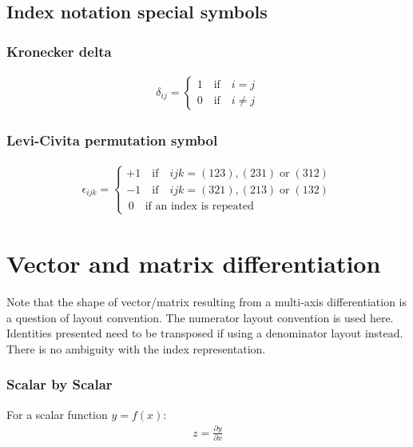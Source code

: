 \subsection{Index notation special symbols}

\subsubsection{ Kronecker delta }
\begin{align}
\delta_{ij} = \left\lbrace \begin{array}{c}
1 \quad\text{if}\quad i=j\\
0 \quad\text{if}\quad i\neq j
\end{array}
\right.
\end{align}


\subsubsection{ Levi-Civita permutation symbol }
\begin{align}
\epsilon_{ijk} = \left\lbrace \begin{array}{l}
+1  \quad\text{if}\quad ijk=(123),(231) \;\text{or}\; (312)\\
-1   \quad\text{if}\quad ijk=(321),(213) \;\text{or}\; (132)\\
\,0  \quad\text{if an index is repeated}
\end{array}
\right.
\end{align}



\section{Vector and matrix differentiation}
\label{sec:vecmatdifferentiation}

Note that the shape of vector/matrix resulting from a multi-axis differentiation is a question of layout convention. The numerator layout convention is used here. Identities presented need to be transposed if using a denominator layout instead. There is no ambiguity with the index representation.

\subsubsection{Scalar by Scalar}

For a scalar function $y = f(x)$: 
\begin{align}
z = \frac{\partial y}{\partial x}
\end{align}



